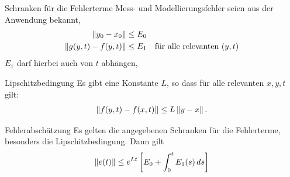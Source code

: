 
\begin{frame}{Schranken für die Fehlerterme}
  Mess- und Modellierungsfehler seien aus der Anwendung bekannt,
  \begin{align*}
    \left\|y_0-x_0\right\| &\le E_0\\
    \left\|g(y,t)-f(y,t)\right\| &\le E_1 \quad\text{für alle relevanten $(y,t)$}
  \end{align*}
  $E_1$ darf hierbei auch von $t$ abhängen,
  \pause
  \begin{block}{Lipschitzbedingung}
    Es gibt eine Konstante $L$, so dass für alle relevanten $x,y,t$ gilt:
    \begin{gather*}
      \left\|f(y,t) - f(x,t)\right\| \le L \left\|y-x\right\|.
    \end{gather*}
  \end{block}
\end{frame}

\begin{frame}
  \begin{block}{Fehlerabschätzung}
    Es gelten die angegebenen Schranken für die Fehlerterme, besonders
    die Lipschitzbedingung. Dann gilt
    \begin{gather*}
       \left\|e(t)\right\|\le e^{Lt} \left[ E_0+\int_0^t E_1(s)\,ds\right]
    \end{gather*}
  \end{block}
\end{frame}

